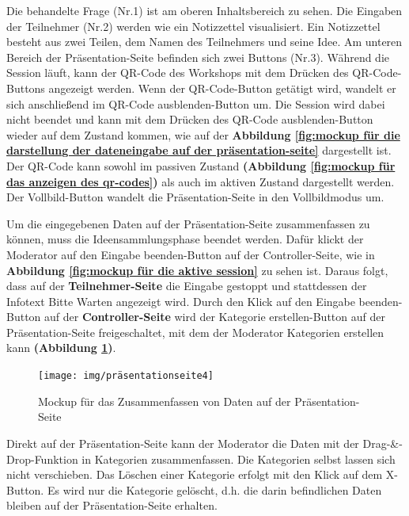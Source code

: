 \begin{itemize}
Die behandelte Frage (Nr.1) ist am oberen Inhaltsbereich zu sehen. Die Eingaben der Teilnehmer (Nr.2) werden wie ein Notizzettel visualisiert. Ein Notizzettel besteht aus zwei Teilen, dem Namen des Teilnehmers und seine Idee. Am unteren Bereich der Präsentation-Seite befinden sich zwei Buttons (Nr.3). Während die Session läuft, kann der QR-Code des Workshops mit dem Drücken des QR-Code-Buttons angezeigt werden. Wenn der QR-Code-Button getätigt wird, wandelt er sich anschließend im \glqq QR-Code ausblenden\grqq{}-Button um. Die Session wird dabei nicht beendet und kann mit dem Drücken des \glqq QR-Code ausblenden\grqq{}-Button wieder auf dem Zustand kommen, wie auf der \textbf{Abbildung \ref{fig:mockup für die darstellung der dateneingabe auf der präsentation-seite}} dargestellt ist. Der QR-Code kann sowohl im passiven Zustand \textbf{(Abbildung \ref{fig:mockup für das anzeigen des qr-codes})} als auch im aktiven Zustand dargestellt werden. Der Vollbild-Button wandelt die Präsentation-Seite in den Vollbildmodus um.\bigskip

Um die eingegebenen Daten auf der Präsentation-Seite zusammenfassen zu können, muss die Ideensammlungsphase beendet werden. Dafür klickt der Moderator auf den \glqq Eingabe beenden\grqq{}-Button auf der Controller-Seite, wie in \textbf{Abbildung \ref{fig:mockup für die aktive session}} zu sehen ist. Daraus folgt, dass auf der \textbf{Teilnehmer-Seite} die Eingabe gestoppt und stattdessen der Infotext \glqq Bitte Warten\grqq{} angezeigt wird. Durch den Klick auf den \glqq Eingabe beenden\grqq{}- Button auf der \textbf{Controller-Seite} wird der \glqq Kategorie erstellen\grqq{}-Button auf der Präsentation-Seite freigeschaltet, mit dem der Moderator Kategorien erstellen kann \textbf{(Abbildung \ref{fig:mockup für zusammenfassung-modus auf der präsentation-seite})}.

\begin{figure}[H]
  \begin{center}
    \texttt{[image: img/präsentationseite4]}
	\caption{Mockup für das Zusammenfassen von Daten auf der Präsentation-Seite}  
	\label{fig:mockup für zusammenfassung-modus auf der präsentation-seite}
  \end{center}   
\end{figure}

Direkt auf der Präsentation-Seite kann der Moderator die Daten mit der Drag-\&-Drop-Funktion in Kategorien zusammenfassen. Die Kategorien selbst lassen sich nicht verschieben. Das Löschen einer Kategorie erfolgt mit den Klick auf dem X-Button. Es wird nur die Kategorie gelöscht, d.h. die darin befindlichen Daten bleiben auf der Präsentation-Seite erhalten.
\end{itemize}

